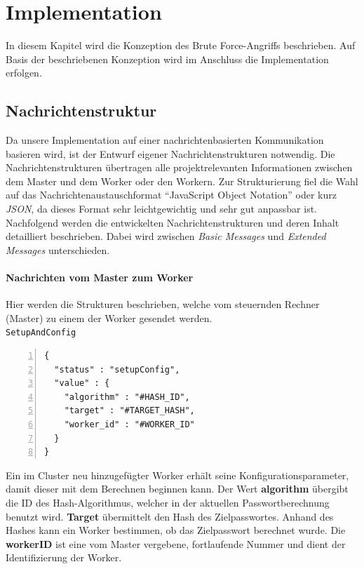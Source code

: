 \chapter{Implementation}
\label{implementation}
In diesem Kapitel wird die Konzeption des Brute Force-Angriffs beschrieben. Auf Basis der beschriebenen Konzeption wird im Anschluss die Implementation erfolgen. 
\section{Nachrichtenstruktur}
Da unsere Implementation auf einer nachrichtenbasierten Kommunikation basieren wird, ist der Entwurf eigener Nachrichtenstrukturen notwendig. Die Nachrichtenstrukturen übertragen alle projektrelevanten Informationen zwischen dem Master und dem Worker oder den Workern. Zur Strukturierung fiel die Wahl auf das Nachrichtenaustauschformat \enquote{JavaScript Object Notation} oder kurz \emph{JSON}, da dieses Format sehr leichtgewichtig und sehr gut anpassbar ist. \\
Nachfolgend werden die entwickelten Nachrichtenstrukturen und deren Inhalt detailliert beschrieben. Dabei wird zwischen \emph{Basic Messages} und \emph{Extended Messages} unterschieden. 

\subsubsection{Nachrichten vom Master zum Worker}
Hier werden die Strukturen beschrieben, welche vom steuernden Rechner (Master) zu einem der Worker gesendet werden.\\

\texttt{SetupAndConfig}
\begin{lstlisting}[basicstyle=\ttfamily,numbers=left,numberstyle=\footnotesize\ttfamily,backgroundcolor=\color{sourcegray}]
{
  "status" : "setupConfig",
  "value" : {
    "algorithm" : "#HASH_ID",
    "target" : "#TARGET_HASH", 
    "worker_id" : "#WORKER_ID"
  }
}
\end{lstlisting}
Ein im Cluster neu hinzugefügter Worker erhält seine Konfigurationsparameter, damit dieser mit dem Berechnen beginnen kann. 
Der Wert \textbf{algorithm} übergibt die ID des Hash-Algorithmus, welcher in der aktuellen Passwortberechnung benutzt wird. \textbf{Target} übermittelt den Hash des Zielpasswortes. Anhand des Hashes kann ein Worker bestimmen, ob das Zielpasswort berechnet wurde. Die \textbf{workerID} ist eine vom Master vergebene, fortlaufende Nummer und dient der Identifizierung der Worker.\\

